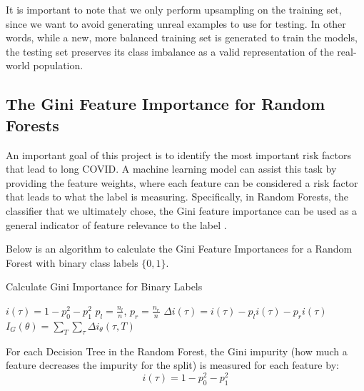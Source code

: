 \documentclass{article}
\begin{document}
It is important to note that we only perform upsampling on the training set, since we want to avoid generating unreal examples to use for testing. In other words, while a new, more balanced training set is generated to train the models, the testing set preserves its class imbalance as a valid representation of the real-world population.


\subsection{The Gini Feature Importance for Random Forests}

An important goal of this project is to identify the most important risk factors that lead to long COVID. A machine learning model can assist this task by providing the feature weights, where each feature can be considered a risk factor that leads to what the label is measuring. Specifically, in Random Forests, the classifier that we ultimately chose, the Gini feature importance can be used as a general indicator of feature relevance to the label \citep{scikit-learn}.

Below is an algorithm to calculate the Gini Feature Importances for a Random Forest with binary class labels $\{0, 1\}$.

\begin{algorithm}
\caption{Calculate Gini Importance for Binary Labels}\label{alg:cap}
\begin{algorithmic}
      \STATE \textcolor{gray}{}
      \STATE $i(\tau) = 1 - p_0^2 - p_1^2$ 
          \STATE \textcolor{gray}{}
          \STATE $p_l = \frac{n_l}{n}$, $p_r = \frac{n_r}{n}$ 
          \STATE \textcolor{gray}{}
          \STATE $\Delta i(\tau) = i(\tau) - p_l i(\tau) - p_r i(\tau)$ 
        \ENDFOR
      \ENDFOR
    \ENDFOR
    \STATE
      \STATE \textcolor{gray}{}
      \STATE $I_G(\theta) = \sum_T \sum_\tau \Delta i_\theta (\tau, T)$
    \ENDFOR
\end{algorithmic}
\end{algorithm}

For each Decision Tree in the Random Forest, the Gini impurity (how much a feature decreases the impurity for the split) is measured for each feature by:
$$i(\tau) = 1 - p_0^2 - p_1^2$$
\end{document}
